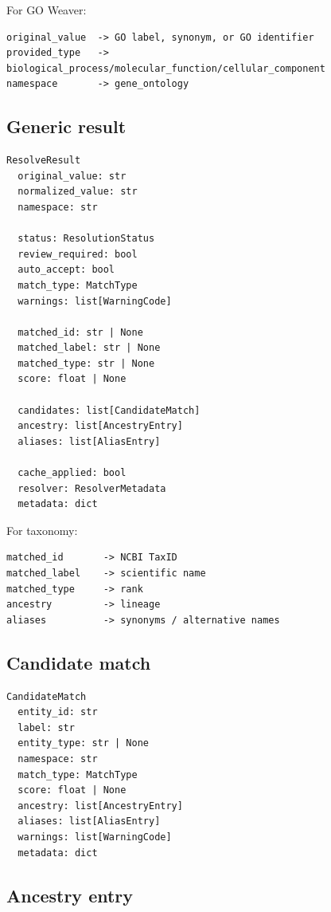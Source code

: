 \documentclass[11pt,a4paper]{article}
\begin{document}
For GO Weaver:

\begin{Verbatim}[fontsize=\small]
original_value  -> GO label, synonym, or GO identifier
provided_type   -> biological_process/molecular_function/cellular_component
namespace       -> gene_ontology
\end{Verbatim}

\subsection{Generic result}

\begin{Verbatim}[fontsize=\small]
ResolveResult
  original_value: str
  normalized_value: str
  namespace: str

  status: ResolutionStatus
  review_required: bool
  auto_accept: bool
  match_type: MatchType
  warnings: list[WarningCode]

  matched_id: str | None
  matched_label: str | None
  matched_type: str | None
  score: float | None

  candidates: list[CandidateMatch]
  ancestry: list[AncestryEntry]
  aliases: list[AliasEntry]

  cache_applied: bool
  resolver: ResolverMetadata
  metadata: dict
\end{Verbatim}

For taxonomy:

\begin{Verbatim}[fontsize=\small]
matched_id       -> NCBI TaxID
matched_label    -> scientific name
matched_type     -> rank
ancestry         -> lineage
aliases          -> synonyms / alternative names
\end{Verbatim}

\subsection{Candidate match}

\begin{Verbatim}[fontsize=\small]
CandidateMatch
  entity_id: str
  label: str
  entity_type: str | None
  namespace: str
  match_type: MatchType
  score: float | None
  ancestry: list[AncestryEntry]
  aliases: list[AliasEntry]
  warnings: list[WarningCode]
  metadata: dict
\end{Verbatim}

\subsection{Ancestry entry}
\end{document}

